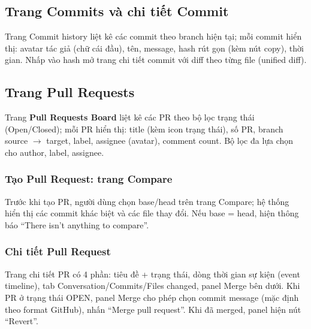 
\subsection{Trang Commits và chi tiết Commit}
Trang Commit history liệt kê các commit theo branch hiện tại; mỗi commit hiển thị: avatar tác giả (chữ cái đầu), tên, message, hash rút gọn (kèm nút copy), thời gian. Nhấp vào hash mở trang chi tiết commit với diff theo từng file (unified diff).


\subsection{Trang Pull Requests}
Trang \textbf{Pull Requests Board} liệt kê các PR theo bộ lọc trạng thái (Open/Closed); mỗi PR hiển thị: title (kèm icon trạng thái), số PR, branch source $\to$ target, label, assignee (avatar), comment count. Bộ lọc đa lựa chọn cho author, label, assignee.


\subsubsection{Tạo Pull Request: trang Compare}
Trước khi tạo PR, người dùng chọn base/head trên trang Compare; hệ thống hiển thị các commit khác biệt và các file thay đổi. Nếu base = head, hiện thông báo ``There isn't anything to compare''.


\subsubsection{Chi tiết Pull Request}
Trang chi tiết PR có 4 phần: tiêu đề + trạng thái, dòng thời gian sự kiện (event timeline), tab Conversation/Commits/Files changed, panel Merge bên dưới. Khi PR ở trạng thái OPEN, panel Merge cho phép chọn commit message (mặc định theo format GitHub), nhấn ``Merge pull request''. Khi đã merged, panel hiện nút ``Revert''.


